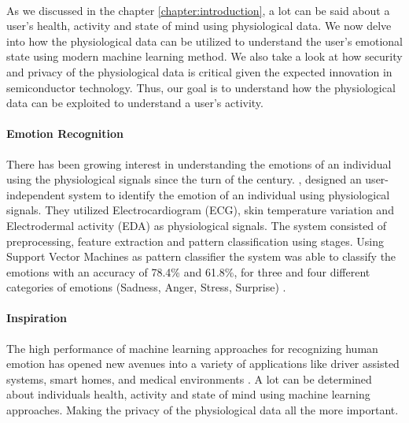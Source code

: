 \label{chapter:motivation}
\paragraph{}
As we discussed in the chapter \ref{chapter:introduction}, a lot can be said about a user's health, activity and state of mind using physiological data. We now delve into how the physiological data can be utilized to understand the user's emotional state using modern machine learning method. We also take a look at how security and privacy of the physiological data is critical given the expected innovation in semiconductor technology. Thus, our goal is to understand how the physiological data can be exploited to understand a user's activity.

\paragraph{Emotion Recognition} There has been growing interest in understanding the emotions of an individual using the physiological signals since the turn of the century. \citeauthor{kim_emotion_2004}, designed an user-independent system to identify the emotion of an individual using physiological signals. They utilized Electrocardiogram (ECG), skin temperature variation and Electrodermal activity (EDA) as physiological signals. The system consisted of preprocessing, feature extraction and pattern classification using stages. Using Support Vector Machines as pattern classifier the system was able to classify the emotions with an accuracy of 78.4\% and 61.8\%, for three and four different categories of emotions (Sadness, Anger, Stress, Surprise) \cite{kim_emotion_2004}.

\paragraph{Inspiration} The high performance of machine learning approaches for recognizing human emotion has opened new avenues into a variety of applications like driver assisted systems, smart homes, and medical environments \cite{ali_globally_2018}. A lot can be determined about individuals health, activity and state of mind using machine learning approaches. Making the privacy of the physiological data all the more important.

